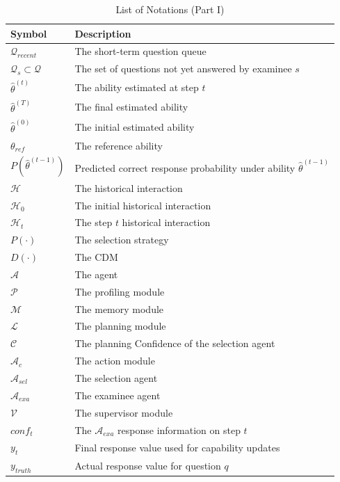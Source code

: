 \renewcommand{\arraystretch}{1.1} %

\begin{table}[!htbp] %
\centering
\caption{List of Notations (Part I)}
\label{tab:notations_part1}
\begin{tabularx}{\columnwidth}{lX}
\toprule
\textbf{Symbol} & \textbf{Description} \\ \midrule
$\mathcal{Q}_{recent}$ & The short-term question queue \\
$\mathcal{Q}_s \subset \mathcal{Q}$ & The set of questions not yet answered by examinee $s$ \\
$\hat{\theta}^{(t)}$ & The ability estimated at step $t$ \\
$\hat{\theta}^{(T)}$ & The final estimated ability \\
$\hat{\theta}^{(0)}$ & The initial estimated ability \\
$\theta_{ref}$ & The reference ability \\
$P(\hat{\theta}^{(t-1)})$ & Predicted correct response probability under ability $\hat{\theta}^{(t-1)}$ \\
$\mathcal{H}$ & The historical interaction \\
$\mathcal{H}_{0}$ & The initial historical interaction \\
$\mathcal{H}_{t}$ & The step $t$ historical interaction \\
$P(\cdot)$ & The selection strategy \\
$D(\cdot)$ & The CDM \\
$\mathcal{A}$ & The agent \\
$\mathcal{P}$ & The profiling module \\
$\mathcal{M}$ & The memory module \\
$\mathcal{L}$ & The planning module \\
$\mathcal{C}$ & The planning Confidence of the selection agent \\
$\mathcal{A}_c$ & The action module \\
$\mathcal{A}_{sel}$ & The selection agent \\
$\mathcal{A}_{exa}$ & The examinee agent \\
$\mathcal{V}$ & The supervisor module \\
$conf_t$ & The $\mathcal{A}_{exa}$ response information on step $t$ \\
$y_t$ & Final response value used for capability updates \\
$y_{truth}$ & Actual response value for question $q$ \\ \bottomrule
\end{tabularx}
\end{table}

